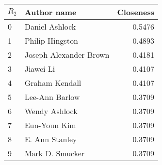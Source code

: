 \begin{tabular}{llr}
\toprule
\(R_2\) &             Author name &  Closeness\\
\midrule
0 &          Daniel Ashlock &              0.5476 \\
1 &         Philip Hingston &              0.4893 \\
2 &  Joseph Alexander Brown &              0.4181 \\
3 &               Jiawei Li &              0.4107 \\
4 &          Graham Kendall &              0.4107 \\
5 &          Lee-Ann Barlow &              0.3709 \\
6 &           Wendy Ashlock &              0.3709 \\
7 &            Eun-Youn Kim &              0.3709 \\
8 &          E. Ann Stanley &              0.3709 \\
9 &         Mark D. Smucker &              0.3709 \\
\bottomrule
\end{tabular}
